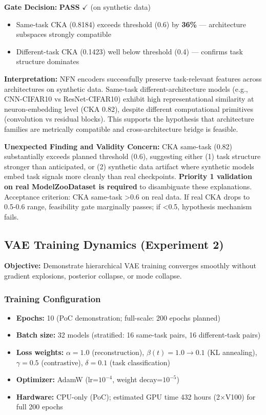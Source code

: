 \textbf{Gate Decision:} \textbf{PASS} $\checkmark$ (on synthetic data)

\begin{itemize}
\item Same-task CKA (0.8184) exceeds threshold (0.6) by \textbf{36\%} --- architecture subspaces strongly compatible
\item Different-task CKA (0.1423) well below threshold (0.4) --- confirms task structure dominates
\end{itemize}

\textbf{Interpretation:} NFN encoders successfully preserve task-relevant features across architectures on synthetic data. Same-task different-architecture models (e.g., CNN-CIFAR10 vs ResNet-CIFAR10) exhibit high representational similarity at neuron-embedding level (CKA 0.82), despite different computational primitives (convolution vs residual blocks). This supports the hypothesis that architecture families are metrically compatible and cross-architecture bridge is feasible.

\textbf{Unexpected Finding and Validity Concern:} CKA same-task (0.82) substantially exceeds planned threshold (0.6), suggesting either (1) task structure stronger than anticipated, or (2) synthetic data artifact where synthetic models embed task signals more cleanly than real checkpoints. \textbf{Priority 1 validation on real ModelZooDataset is required} to disambiguate these explanations. Acceptance criterion: CKA same-task >0.6 on real data. If real CKA drops to 0.5-0.6 range, feasibility gate marginally passes; if <0.5, hypothesis mechanism fails.

\subsection{VAE Training Dynamics (Experiment 2)}

\textbf{Objective:} Demonstrate hierarchical VAE training converges smoothly without gradient explosions, posterior collapse, or mode collapse.

\subsubsection{Training Configuration}

\begin{itemize}
\item \textbf{Epochs:} 10 (PoC demonstration; full-scale: 200 epochs planned)
\item \textbf{Batch size:} 32 models (stratified: 16 same-task pairs, 16 different-task pairs)
\item \textbf{Loss weights:} $\alpha=1.0$ (reconstruction), $\beta(t)=1.0 \to 0.1$ (KL annealing), $\gamma=0.5$ (contrastive), $\delta=0.1$ (task classification)
\item \textbf{Optimizer:} AdamW (lr=$10^{-4}$, weight decay=$10^{-5}$)
\item \textbf{Hardware:} CPU-only (PoC); estimated GPU time 432 hours (2$\times$V100) for full 200 epochs
\end{itemize}

